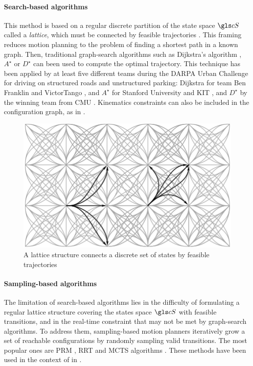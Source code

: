 \paragraph{Search-based algorithms}

This method is based on a regular discrete partition of the state space $\cS$ called a \emph{lattice}, which must be connected by feasible trajectories \citep[\eg][]{Pivtoraiko2005}. This framing reduces motion planning to the problem of finding a shortest path in a known graph. Then, traditional graph-search algorithms such as Dijkstra's algorithm \citep{Dijkstra1959}, $A^\star$ \citep{Hart1968} or $D^\star$ \citep{Stentz1994} can been used to compute the optimal trajectory. This technique has been applied by at least five different teams during the DARPA Urban Challenge for driving on structured roads and unstructured parking: Dijkstra for team Ben Franklin \citep{Bohren2008} and VictorTango \citep{Bacha2008}, and $A^\star$ for Stanford University \citep{Montemerlo2008} and KIT \citep{Kammel2008}, and $D^\star$ by the winning team from CMU \citep{Urmson2008}. Kinematics constraints can also be included in the configuration graph, as in \citep[\eg][]{Latombe1991,Fraichard1993,Laumond1994}.

\begin{figure}[tp]
	\centering
	\includegraphics[width=0.5\linewidth]{img/lattice2}
	\caption{A lattice structure connects a discrete set of states by feasible trajectories}
\end{figure}

\paragraph{Sampling-based algorithms}

The limitation of search-based algorithms lies in the difficulty of formulating a regular lattice structure covering the states space $\cS$ with feasible transitions, and in the real-time constraint that may not be met by graph-search algorithms. To address them, sampling-based motion planners iteratively grow a set of reachable configurations by randomly sampling valid transitions. The most popular ones are \gls{PRM} \citep{Kavraki1996}, \gls{RRT} \citep{Lavalle98,Karaman2011} and \gls{MCTS} algorithms \citep{Coulom2006, Kocsis2006}. These methods have been used in the context of  in \citep[\eg][]{Lamiraux2001,Sanchez2002,Lenz2016,Paxton2017,Faust2018}.

